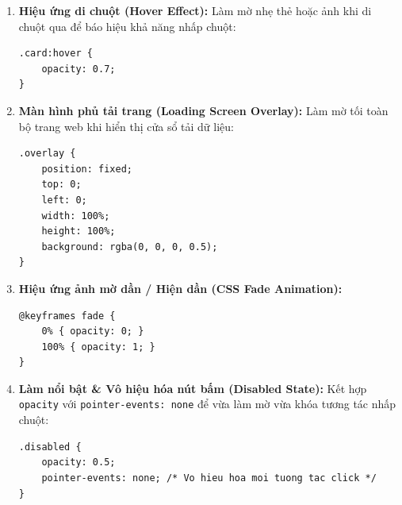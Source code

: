 \documentclass[11pt,oneside]{book}
\newcommand{\codeinline}[1]{\textcolor{accentOrange}{\texttt{#1}}}
\begin{document}
\begin{conceptBox}
\begin{enumerate}[leftmargin=1.5em, itemsep=5pt, parsep=0pt]
    \item \textbf{Hiệu ứng di chuột (Hover Effect):} Làm mờ nhẹ thẻ hoặc ảnh khi di chuột qua để báo hiệu khả năng nhấp chuột:
\begin{codeWindow}
\begin{lstlisting}[language=CSS3]
.card:hover {
    opacity: 0.7;
}
\end{lstlisting}
\end{codeWindow}

    \item \textbf{Màn hình phủ tải trang (Loading Screen Overlay):} Làm mờ tối toàn bộ trang web khi hiển thị cửa sổ tải dữ liệu:
\begin{codeWindow}
\begin{lstlisting}[language=CSS3]
.overlay {
    position: fixed;
    top: 0;
    left: 0;
    width: 100%;
    height: 100%;
    background: rgba(0, 0, 0, 0.5);
}
\end{lstlisting}
\end{codeWindow}

    \item \textbf{Hiệu ứng ảnh mờ dần / Hiện dần (CSS Fade Animation):}
\begin{codeWindow}
\begin{lstlisting}[language=CSS3]
@keyframes fade {
    0% { opacity: 0; }
    100% { opacity: 1; }
}
\end{lstlisting}
\end{codeWindow}

    \item \textbf{Làm nổi bật \& Vô hiệu hóa nút bấm (Disabled State):} Kết hợp \codeinline{opacity} với \codeinline{pointer-events: none} để vừa làm mờ vừa khóa tương tác nhấp chuột:
\begin{codeWindow}
\begin{lstlisting}[language=CSS3]
.disabled {
    opacity: 0.5;
    pointer-events: none; /* Vo hieu hoa moi tuong tac click */
}
\end{lstlisting}
\end{codeWindow}
\end{enumerate}
\end{conceptBox}
\end{document}
